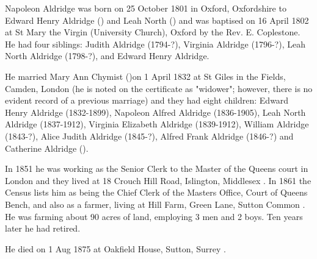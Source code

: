 
Napoleon Aldridge was born on 25 October 1801 in Oxford, Oxfordshire to Edward Henry Aldridge () and Leah North () \cite{NapoleonAldridgeBirth} and was baptised on 16 April 1802 at St Mary the Virgin (University Church), Oxford by the Rev. E. Coplestone.  He had four siblings:  Judith Aldridge (1794-?), Virginia Aldridge (1796-?), Leah North Aldridge (1798-?), and Edward Henry Aldridge.

He married Mary Ann Chymist ()on 1 April 1832 at St Giles in the Fields, Camden, London \cite{NapoleonAldridgeMarriage}  (he is noted on the certificate as "widower"; however, there is no evident record of a previous marriage) and they had eight children:  Edward Henry Aldridge (1832-1899),  Napoleon Alfred Aldridge (1836-1905), Leah North Aldridge (1837-1912), Virginia Elizabeth Aldridge (1839-1912), William Aldridge (1843-?), Alice Judith Aldridge (1845-?), Alfred Frank Aldridge (1846-?) and Catherine Aldridge ().

In 1851 he was working as the Senior Clerk to the Master of the Queens court in London and they lived at 18 Crouch Hill Road, Islington, Middlesex \cite{NapoleonAldridgeOccupation}.  In 1861 the Census lists him as being the Chief Clerk of the Masters Office, Court of Queens Bench, and also as a farmer, living at Hill Farm, Green Lane, Sutton Common \cite{NapoleonAldridgeResidence}.  He was farming about 90 acres of land, employing 3 men and 2 boys.  Ten years later he had retired.
	
He died on 1 Aug 1875 at Oakfield House, Sutton, Surrey \cite{NapoleonAldridgeDeath}.


